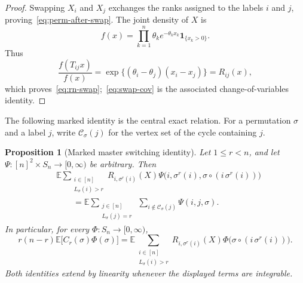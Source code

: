 \documentclass[11pt]{article}
\newcommand{\E}{\mathbb E}
\newcommand{\1}{\mathbf 1}
\newtheorem{proposition}[theorem]{Proposition}
\theoremstyle{definition}
\theoremstyle{remark}
\begin{document}
\begin{proof}
Swapping $X_i$ and $X_j$ exchanges the ranks assigned to the labels $i$
and $j$, proving~\eqref{eq:perm-after-swap}.  The joint density of $X$ is
\[
  f(x)=\prod_{k=1}^n\theta_k e^{-\theta_kx_k}\1_{\{x_k>0\}}.
\]
Thus
\[
  \frac{f(T_{ij}x)}{f(x)}
  =\exp\{(\theta_i-\theta_j)(x_i-x_j)\}
  =R_{ij}(x),
\]
which proves~\eqref{eq:rn-swap};~\eqref{eq:swap-cov} is the associated
change-of-variables identity.
\end{proof}

The following marked identity is the central exact relation.  For a
permutation $\sigma$ and a label $j$, write $\mathcal C_\sigma(j)$ for
the vertex set of the cycle containing $j$.

\begin{proposition}[Marked master switching identity]
\label{prop:master-switch}
Let $1\leq r<n$, and let
$\Psi:[n]^2\times S_n\to[0,\infty)$ be arbitrary.  Then
\begin{align}
 &\E\sum_{\substack{i\in[n]\\L_\sigma(i)>r}}
 R_{i,\sigma^r(i)}(X)
 \Psi\bigl(i,\sigma^r(i),\sigma\circ(i\,\sigma^r(i))\bigr)
 \nonumber\\
 &\qquad=
 \E\sum_{\substack{j\in[n]\\L_\sigma(j)=r}}
 \ \sum_{i\notin\mathcal C_\sigma(j)}
 \Psi(i,j,\sigma).
 \label{eq:marked-master-switch}
\end{align}
In particular, for every $\Phi:S_n\to[0,\infty)$,
\begin{equation}\label{eq:master-switch}
 r(n-r)\E\bigl[C_r(\sigma)\Phi(\sigma)\bigr]
 =
 \E\sum_{\substack{i\in[n]\\L_\sigma(i)>r}}
 R_{i,\sigma^r(i)}(X)
 \Phi\bigl(\sigma\circ(i\,\sigma^r(i))\bigr).
\end{equation}
Both identities extend by linearity whenever the displayed terms are
integrable.
\end{proposition}
\end{document}
